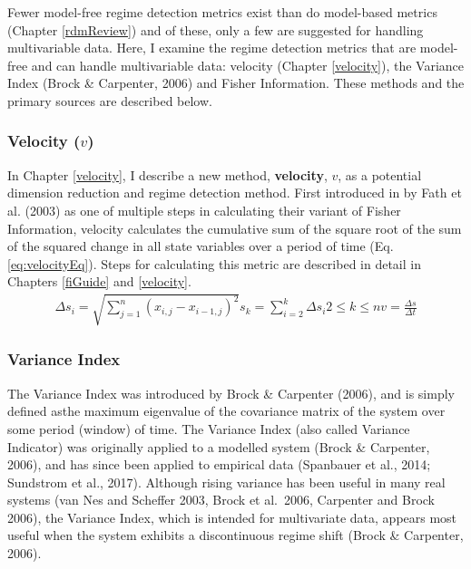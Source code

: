 \documentclass[12pt,twoside,openany]{reedthesis}
\begin{document}
Fewer model-free regime detection metrics exist than do model-based metrics (Chapter \ref{rdmReview}) and of these, only a few are suggested for handling multivariable data. Here, I examine the regime detection metrics that are model-free and can handle multivariable data: velocity (Chapter \ref{velocity}), the Variance Index (Brock \& Carpenter, 2006) and Fisher Information. These methods and the primary sources are described below.

\hypertarget{velocity-v}{%
\subsubsection{\texorpdfstring{Velocity (\(v\))}{Velocity (v)}}\label{velocity-v}}

In Chapter \ref{velocity}, I describe a new method, \textbf{velocity}, \(v\), as a potential dimension reduction and regime detection method. First introduced in by Fath et al. (2003) as one of multiple steps in calculating their variant of Fisher Information, velocity calculates the cumulative sum of the square root of the sum of the squared change in all state variables over a period of time (Eq. \eqref{eq:velocityEq}). Steps for calculating this metric are described in detail in Chapters \ref{fiGuide} and \ref{velocity}.
\begin{equation}
\begin{array}{rcr}
\Delta s_i = \sqrt{\sum_{j=1}^{n} (x_{i,j} -x_{i-1, j})^2}
s_k =  \sum_{i=2}^{k}\Delta{s_i}
2\leq k \leq n
v =\frac{\Delta s}{\Delta t}  
\end{array}
\label{eq:velocityEq}
\end{equation}
\hypertarget{variance-index}{%
\subsubsection{Variance Index}\label{variance-index}}

The Variance Index was introduced by Brock \& Carpenter (2006), and is simply defined asthe maximum eigenvalue of the covariance matrix of the system over some period (window) of time. The Variance Index (also called Variance Indicator) was originally applied to a modelled system (Brock \& Carpenter, 2006), and has since been applied to empirical data (Spanbauer et al., 2014; Sundstrom et al., 2017). Although rising variance has been useful in many real systems (van Nes and Scheffer 2003, Brock et al.~2006, Carpenter and Brock 2006), the Variance Index, which is intended for multivariate data, appears most useful when the system exhibits a discontinuous regime shift (Brock \& Carpenter, 2006).
\end{document}
